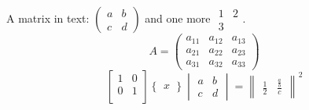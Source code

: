 \documentclass{article}
\begin{document}
A matrix in text: $\begin{pmatrix} a & b \\ c & d \end{pmatrix}$ and one more $\begin{matrix} 1 & 2 \\ 3 \end{matrix}$.
\begin{equation}
A = \begin{pmatrix} a_{11} & a_{12} & a_{13} \\ a_{21} & a_{22} & a_{23} \\ a_{31} & a_{32} & a_{33} \end{pmatrix}
\end{equation}
\[ \begin{bmatrix} 1 & 0 \\ 0 & 1 \\ \end{bmatrix} \begin{Bmatrix} x \end{Bmatrix} \begin{vmatrix} a & b \\ c & d \end{vmatrix} = \begin{Vmatrix} \frac{1}{2} & \frac{\frac{a}{b}}{c} \end{Vmatrix}^2 \]
\end{document}
